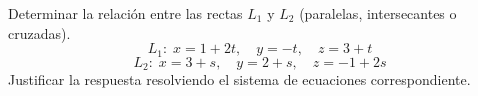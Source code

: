 Determinar la relación entre las rectas $L_1$ y $L_2$ (paralelas, intersecantes o cruzadas).
\[ L_1:\; x = 1 + 2t,\quad y = -t,\quad z = 3 + t \]
\[ L_2:\; x = 3 + s,\quad y = 2 + s,\quad z = -1 + 2s \]
Justificar la respuesta resolviendo el sistema de ecuaciones correspondiente.